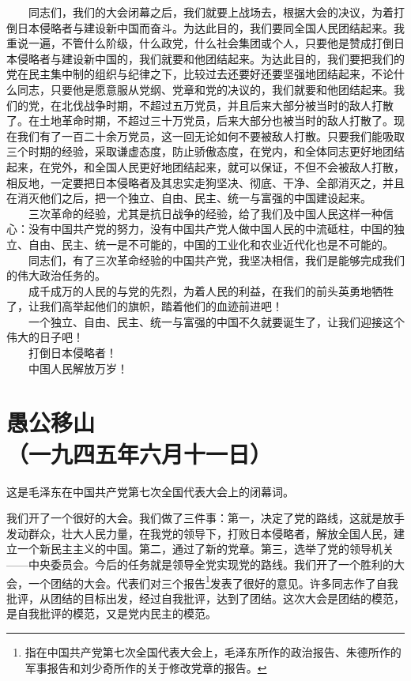 \documentclass[cn,11pt,chinese]{elegantbook}
\def\myformat#1{\hfil\hfil #1}
\begin{document}
　　同志们，我们的大会闭幕之后，我们就要上战场去，根据大会的决议，为着打倒日本侵略者与建设新中国而奋斗。为达此目的，我们要同全国人民团结起来。我重说一遍，不管什么阶级，什么政党，什么社会集团或个人，只要他是赞成打倒日本侵略者与建设新中国的，我们就要和他团结起来。为达此目的，我们要把我们的党在民主集中制的组织与纪律之下，比较过去还要好还要坚强地团结起来，不论什么同志，只要他是愿意服从党纲、党章和党的决议的，我们就要和他团结起来。我们的党，在北伐战争时期，不超过五万党员，并且后来大部分被当时的敌人打散了。在土地革命时期，不超过三十万党员，后来大部分也被当时的敌人打散了。现在我们有了一百二十余万党员，这一回无论如何不要被敌人打散。只要我们能吸取三个时期的经验，采取谦虚态度，防止骄傲态度，在党内，和全体同志更好地团结起来，在党外，和全国人民更好地团结起来，就可以保证，不但不会被敌人打散，相反地，一定要把日本侵略者及其忠实走狗坚决、彻底、干净、全部消灭之，并且在消灭他们之后，把一个独立、自由、民主、统一与富强的中国建设起来。\\
　　三次革命的经验，尤其是抗日战争的经验，给了我们及中国人民这样一种信心：没有中国共产党的努力，没有中国共产党人做中国人民的中流砥柱，中国的独立、自由、民主、统一是不可能的，中国的工业化和农业近代化也是不可能的。\\
　　同志们，有了三次革命经验的中国共产党，我坚决相信，我们是能够完成我们的伟大政治任务的。\\
　　成千成万的人民的与党的先烈，为着人民的利益，在我们的前头英勇地牺牲了，让我们高举起他们的旗帜，踏着他们的血迹前进吧！\\
　　一个独立、自由、民主、统一与富强的中国不久就要诞生了，让我们迎接这个伟大的日子吧！\\
　　打倒日本侵略者！\\
　　中国人民解放万岁！\\
\newpage\section*{\myformat{愚公移山}\\\myformat{（一九四五年六月十一日）}}
\begin{introduction}\item  这是毛泽东在中国共产党第七次全国代表大会上的闭幕词。\end{introduction}
我们开了一个很好的大会。我们做了三件事：第一，决定了党的路线，这就是放手发动群众，壮大人民力量，在我党的领导下，打败日本侵略者，解放全国人民，建立一个新民主主义的中国。第二，通过了新的党章。第三，选举了党的领导机关——中央委员会。今后的任务就是领导全党实现党的路线。我们开了一个胜利的大会，一个团结的大会。代表们对三个报告\footnote[1]{ 指在中国共产党第七次全国代表大会上，毛泽东所作的政治报告、朱德所作的军事报告和刘少奇所作的关于修改党章的报告。}发表了很好的意见。许多同志作了自我批评，从团结的目标出发，经过自我批评，达到了团结。这次大会是团结的模范，是自我批评的模范，又是党内民主的模范。\\
\end{document}
